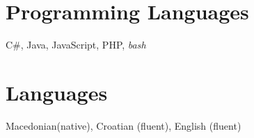 \documentclass[margin,line]{resume}
\begin{document}
\begin{resume}
    \section{\mysidestyle Programming Languages} 

    C\#, Java, JavaScript, PHP, \textsl{bash}

    \section{\mysidestyle Languages} 

    Macedonian(native), Croatian (fluent), English (fluent)
    


\end{resume}
\end{document}
